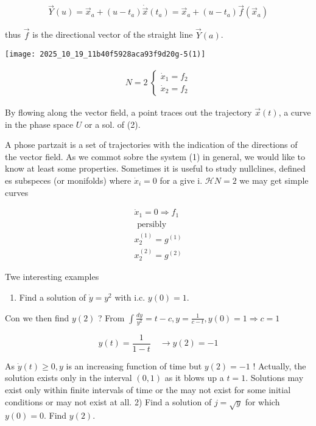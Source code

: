 $$ 
\vec{Y}(u)=\vec{x}_{a}+\left(u-t_{a}\right) \dot{\vec{x}}\left(t_{a}\right)=\vec{x}_{a}+\left(u-t_{a}\right) \vec{f}\left(\vec{x}_{a}\right) 
$$ 

thus $\vec{f}$ is the directional vector of the straight line $\vec{Y}(a)$.
\begin{center}
\texttt{[image: 2025\_10\_19\_11b40f5928aca93f9d20g-5(1)]}
\end{center}


\begin{gather*}
N=2 \ \left\{\begin{array}{l}
\dot{x}_{1}=f_{2}\\ \dot{x}_{2}=f_{2}
\end{array}\right. 	\tag{2}
\end{gather*}

By flowing along the vector field, a point traces out the trajectory $\vec{x}(t)$, a curve in the phase space $U$ or a sol. of (2).

A phose partzait is a set of trajectories with the indication of the directions of the vector field.
As we commot sobre the system (1) in general, we would like to know at least some properties.
Sometimes it is useful to study nullclines, defined es subspeces (or monifolds) where $\dot{x}_{i}=0$ for a give i. $\mathcal{H} N=2$ we may get simple curves

$$ 
\begin{array}{r}
\dot{x}_{1}=0 \Rightarrow f_{1}\\ \text { persibly } \\ x_{2}^{(1)}=g^{(1)}\\ x_{2}^{(2)}=g^{(2)}
\end{array}
$$ 

Twe interesting examples

\begin{enumerate}
  \item Find a solution of $\dot{y}=y^{2}$ with i.c. $y(0)=1$.
\end{enumerate}

Con we then find $y(2)$ ?
From $\int \frac{d y}{y^{2}}=t-c, y=\frac{1}{c-t}, y(0)=1 \Rightarrow c=1$

$$ 
y(t)=\frac{1}{1-t} \quad \rightarrow y(2)=-1 
$$ 

As $\dot{y}(t) \geqslant 0, y$ is an increasing function of time but $y(2)=-1$ ! Actually, the solution exists only in the interval $(0,1)$ as it blows up a $t=1$.
Solutions may exist only within finite intervals of time or the may not exist for some initial conditions or may not exist at all.
2) Find a solution of $j=\sqrt{y}$ for which $y(0)=0$. Find $y(2)$. 

